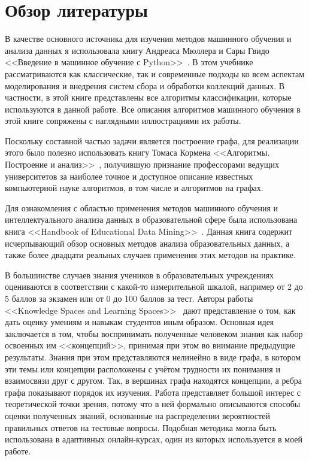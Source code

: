 \documentclass[14pt]{matmex-diploma-custom}
\begin{document}
\section{Обзор литературы}

В качестве основного источника для изучения методов машинного обучения и анализа данных я использовала книгу Андреаса Мюллера и Сары Гвидо <<Введение в машинное обучение с Python>>~\cite{mloreilly}. В этом учебнике рассматриваются как классические, так и современные подходы ко всем аспектам моделирования и внедрения систем сбора и обработки коллекций данных. В частности, в этой книге представлены все алгоритмы классификации, которые используются в данной работе. Все описания алгоритмов машинного обучения в этой книге сопряжены с наглядными иллюстрациями их работы.

Поскольку составной частью задачи является построение графа, для реализации этого было полезно использовать книгу Томаса Кормена <<Алгоритмы. Построение и анализ>>~\cite{cormen}, получившую признание профессорами ведущих университетов за наиболее точное и доступное описание известных компьютерной науке алгоритмов, в том числе и алгоритмов на графах.

Для ознакомления с областью применения методов машинного обучения и интеллектуального анализа данных в образовательной сфере была использована книга <<Handbook of Educational Data Mining>>~\cite{handbook}. Данная книга содержит исчерпывающий обзор основных методов анализа образовательных данных, а также более двадцати реальных случаев применения этих методов на практике.

В большинстве случаев знания учеников в образовательных учреждениях оцениваются в соответствии с какой-то измерительной шкалой, например от 2 до 5 баллов за экзамен или от 0 до 100 баллов за тест. Авторы работы <<Knowledge Spaces and Learning Spaces>>~\cite{knowspaces} дают представление о том, как дать оценку умениям и навыкам студентов иным образом. Основная идея заключается в том, чтобы воспринимать полученные человеком знания как набор освоенных им <<концепций>>, принимая при этом во внимание предыдущие результаты. Знания при этом представляются нелинейно в виде графа, в котором эти темы или концепции расположены с учётом трудности их понимания и взаимосвязи друг с другом. Так, в вершинах графа находятся концепции, а ребра графа показывают порядок их изучения. Работа представляет большой интерес с теоретической точки зрения, потому что в ней формально описываются способы оценки полученных знаний, основанные на распределении вероятностей правильных ответов на тестовые вопросы. Подобная методика могла быть использована в адаптивных онлайн-курсах, один из которых используется в моей работе.
\end{document}
